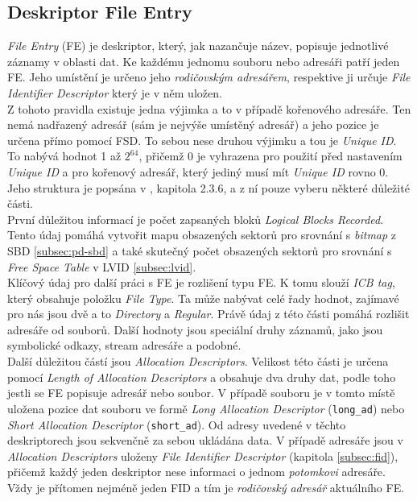 \subsection{Deskriptor File Entry}
\label{subsec:fe}
\textit{File Entry} (FE) je deskriptor, který, jak nazančuje název, popisuje jednotlivé záznamy v oblasti dat. Ke každému jednomu souboru nebo adresáři patří jeden FE. Jeho umístění je určeno jeho \textit{rodičovským adresářem}, respektive ji určuje \textit{File Identifier Descriptor} který je v něm uložen.\\
Z tohoto pravidla existuje jedna výjimka a to v případě kořenového adresáře. Ten nemá nadřazený adresář (sám je nejvýše umístěný adresář) a jeho pozice je určena přímo pomocí FSD. To sebou nese druhou výjimku a tou je \textit{Unique ID}. To nabývá hodnot 1 až $2^{64}$, přičemž 0 je vyhrazena pro použití před nastavením \textit{Unique ID} a pro kořenový adresář, který jediný musí mít \textit{Unique ID} rovno 0.\\
Jeho struktura je popsána v \cite{osta-udf-0201}, kapitola 2.3.6, a z ní pouze vyberu některé důležité části.\\
První důležitou informací je počet zapsaných bloků \textit{Logical Blocks Recorded}. Tento údaj pomáhá vytvořit mapu obsazených sektorů pro srovnání s \textit{bitmap} z SBD \ref{subsec:pd-sbd} a také skutečný počet obsazených sektorů pro srovnání s \textit{Free Space Table} v LVID \ref{subsec:lvid}.\\
Klíčový údaj pro další práci s FE je rozlišení typu FE. K tomu slouží \textit{ICB tag}, který obsahuje položku \textit{File Type}. Ta může nabývat celé řady hodnot, zajímavé pro nás jsou dvě a to \textit{Directory} a \textit{Regular}. Právě údaj z této části pomáhá rozlišit adresáře od souborů. Další hodnoty jsou speciální druhy záznamů, jako jsou symbolické odkazy, stream adresáře a podobné.\\ 
Další důležitou částí jsou \textit{Allocation Descriptors}. Velikost této části je určena pomocí \textit{Length of Allocation Descriptors} a obsahuje dva druhy dat, podle toho jestli se FE popisuje adresář nebo soubor. V případě souboru je v tomto místě uložena pozice dat souboru ve formě \textit{Long Allocation Descriptor} (\texttt{long\_ad}) nebo \textit{Short Allocation Descriptor} (\texttt{short\_ad}). Od adresy uvedené v těchto deskriptorech jsou sekvenčně za sebou ukládána data. V případě adresáře jsou v \textit{Allocation Descriptors} uloženy \textit{File Identifier Descriptor} (kapitola \ref{subsec:fid}), přičemž každý jeden deskriptor nese informaci o jednom \textit{potomkovi} adresáře. Vždy je přítomen nejméně jeden FID a tím je \textit{rodičovský adresář} aktuálního FE.\\
